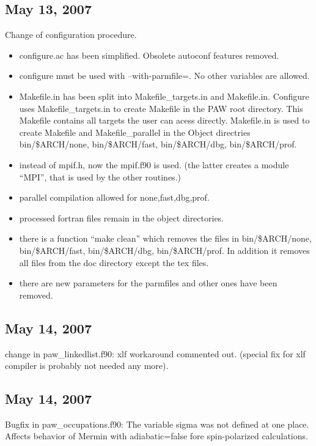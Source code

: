 \documentclass[final,12pt]{article}
\begin{document}
\subsection{May 13,  2007}

Change of configuration procedure.
\begin{itemize}
\item configure.ac has been simplified. Obsolete autoconf features removed.
\item configure must be used with --with-parmfile=. No other variables
  are allowed.
\item Makefile.in has been split into Makefile\_targets.in and
  Makefile.in. Configure uses Makefile\_targets.in to create Makefile
  in the PAW root directory. This Makefile contains all targets the
  user can acess directly. Makefile.in is used to create Makefile and
  Makefile\_parallel in the Object directries bin/\$ARCH/none,
  bin/\$ARCH/fast, bin/\$ARCH/dbg, bin/\$ARCH/prof.
\item instead of mpif.h, now the mpif.f90 is used. (the latter creates
  a module ``MPI'', that is used by the other routines.)
\item parallel compilation allowed for none,fast,dbg,prof.
\item processed fortran files remain in the object directories.
\item there is a function ``make clean'' which removes the files in
  bin/\$ARCH/none, bin/\$ARCH/fast, bin/\$ARCH/dbg, bin/\$ARCH/prof.
  In addition it removes all files from the doc directory except the
  tex files.
\item there are new parameters for the parmfiles and other ones have
  been removed.
\end{itemize}
   
\subsection{May 14,  2007}

change in paw\_linkedlist.f90: xlf workaround commented out. (special
fix for xlf compiler is probably not needed any more).

\subsection{May 14,  2007}

Bugfix in paw\_occupations.f90: The variable sigma was not defined at
one place. Affects behavior of Mermin with adiabatic=false fore
spin-polarized calculations.
\end{document}

